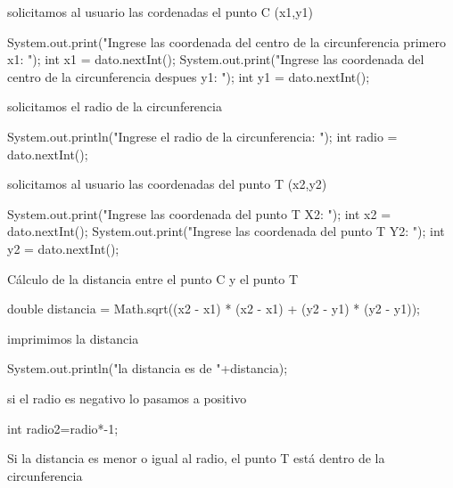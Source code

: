 \documentclass{IEEEcsmag}
\begin{document}
   \begin{javaCode}
       
    public static void main(String[] args) {
        
         Scanner dato = new Scanner(System.in);
        \end{javaCode}
        solicitamos al usuario las cordenadas el punto C (x1,y1)
       \begin{javaCode}
        System.out.print("Ingrese las coordenada del centro de la circunferencia primero x1: ");
        int x1 = dato.nextInt();
        System.out.print("Ingrese las coordenada del centro de la circunferencia despues y1: ");
        int y1 = dato.nextInt();
         \end{javaCode}
         solicitamos el radio de la circunferencia
       
        \begin{javaCode}
        System.out.println("Ingrese el radio de la circunferencia: ");
        int radio = dato.nextInt();
         \end{javaCode}
         
        solicitamos al usuario las coordenadas del punto T (x2,y2)
       \begin{javaCode}
        System.out.print("Ingrese las coordenada del punto T X2: ");
        int x2 = dato.nextInt();
        System.out.print("Ingrese las coordenada del punto T Y2: ");
        int y2 = dato.nextInt();
        \end{javaCode}
         Cálculo de la distancia entre el punto C y el punto T
        \begin{javaCode}
        double distancia = Math.sqrt((x2 - x1) * (x2 - x1) + (y2 - y1) * (y2 - y1));
        \end{javaCode}
         imprimimos la distancia
          \begin{javaCode}
         System.out.println("la distancia es de "+distancia);
          \end{javaCode}
       
        si el radio es negativo lo pasamos a positivo
         \begin{javaCode}
        int radio2=radio*-1;
\end{javaCode}
         Si la distancia es menor o igual al radio, el punto T está dentro de la circunferencia     
       
\end{document}
